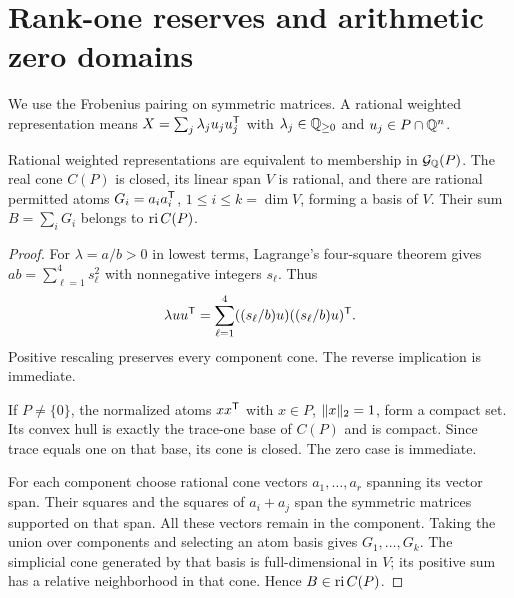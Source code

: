 \section{Rank-one reserves and arithmetic zero domains}\label{sec:zeros}
We use the Frobenius pairing on symmetric matrices. A rational weighted representation means $X=\sum_j\lambda_j u_ju_j^{\mathsf T}$ with $\lambda_j\in\mathbb Q_{\ge0}$ and $u_j\in P\cap\mathbb Q^n$.

\begin{lemma}\label{lem:reserve}
Rational weighted representations are equivalent to membership in $\mathcal G_{\mathbb Q}(P)$. The real cone $C(P)$ is closed, its linear span $V$ is rational, and there are rational permitted atoms $G_i=a_ia_i^{\mathsf T}$, $1\le i\le k=\dim V$, forming a basis of $V$. Their sum $B=\sum_iG_i$ belongs to $\operatorname{ri} C(P)$.
\end{lemma}
\begin{proof}
For $\lambda=a/b>0$ in lowest terms, Lagrange's four-square theorem gives $ab=\sum_{\ell=1}^4s_\ell^2$ with nonnegative integers $s_\ell$. Thus
\[
 \lambda uu^{\mathsf T}=\sum_{\ell=1}^4((s_\ell/b)u)((s_\ell/b)u)^{\mathsf T}.
\]
Positive rescaling preserves every component cone. The reverse implication is immediate.

If $P\ne\{0\}$, the normalized atoms $xx^{\mathsf T}$ with $x\in P$, $\lVert x\rVert_2=1$, form a compact set. Its convex hull is exactly the trace-one base of $C(P)$ and is compact. Since trace equals one on that base, its cone is closed. The zero case is immediate.

For each component choose rational cone vectors $a_1,\ldots,a_r$ spanning its vector span. Their squares and the squares of $a_i+a_j$ span the symmetric matrices supported on that span. All these vectors remain in the component. Taking the union over components and selecting an atom basis gives $G_1,\ldots,G_k$. The simplicial cone generated by that basis is full-dimensional in $V$; its positive sum has a relative neighborhood in that cone. Hence $B\in\operatorname{ri} C(P)$.
\end{proof}

